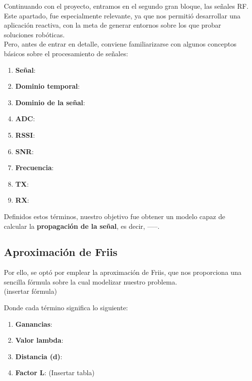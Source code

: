 Continuando con el proyecto, entramos en el segundo gran bloque, las señales \ac{RF}. Este apartado, fue especialmente relevante, ya que nos permitió desarrollar una aplicación reactiva, con la meta de generar entornos sobre los que probar soluciones robóticas.\\

Pero, antes de entrar en detalle, conviene familiarizarse con algunos conceptos básicos sobre el procesamiento de señales:

\begin{enumerate}
	\item \textbf{Señal}:
	
    \item \textbf{Dominio temporal}:
    
    \item \textbf{Dominio de la señal}:
    
    \item \textbf{ADC}:
    
    \item \textbf{RSSI}:
    
    \item \textbf{SNR}:

    \item \textbf{Frecuencia}:
    
    \item \textbf{TX}:
    
    \item \textbf{RX}:
\end{enumerate}

Definidos estos términos, nuestro objetivo fue obtener un modelo capaz de calcular la \textbf{propagación de la señal}, es decir, -----.\\

\subsection{Aproximación de Friis}
\label{subsec:friis}

Por ello, se optó por emplear la aproximación de Friis, que nos proporciona una sencilla fórmula sobre la cual modelizar nuestro problema.\\

(insertar fórmula)

Donde cada término significa lo siguiente:

\begin{enumerate}
    \item \textbf{Ganancias}:
    
    \item \textbf{Valor lambda}:
    
    \item \textbf{Distancia (d)}:
    
    \item \textbf{Factor L}: (Insertar tabla)
\end{enumerate}


